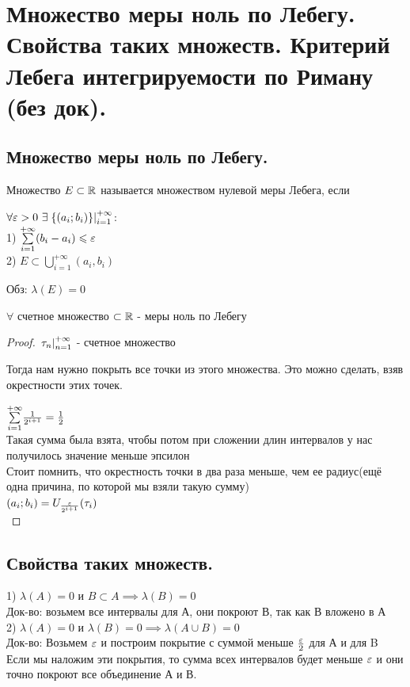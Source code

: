 \section{Множество меры ноль по Лебегу. Свойства таких множеств. Критерий Лебега интегрируемости по Риману (без док).}

\subsection{Множество меры ноль по Лебегу.}
\begin{definition}
    Множество $E \subset \R$ называется множеством нулевой меры Лебега, если

    $\forall \eps > 0~\exists\Subst{\{(a_i; b_i)\}}{i = 1}{+\infty}$:\\
    1) $\Sum{i = 1}{+\infty}(b_i - a_i) \leq \eps$\\
    2) $E \subset \bigcup_{i=1}^{+\infty} (a_i, b_i)$

    Обз: $\lambda(E) = 0$\\
\end{definition}

\begin{example}
    $\forall$ счетное множество $\subset \R$ - меры ноль по Лебегу
    \begin{proof}
        $\Subst{\tau_n}{n = 1}{+\infty}$ - счетное множество

        Тогда нам нужно покрыть все точки из этого множества. Это можно сделать, взяв окрестности этих точек.

        $\Sum{i = 1}{+\infty}\frac{1}{2^{i+1}} = \frac{1}{2}$\\
        Такая сумма была взята, чтобы потом при сложении длин интервалов у нас получилось значение меньше эпсилон\\
        Стоит помнить, что окрестность точки в два раза меньше, чем ее радиус(ещё одна причина, по которой мы взяли такую сумму)\\ 
        $(a_i; b_i) = U_{\frac{\eps}{2^{i+1}}}(\tau_i)$\\
    \end{proof}
\end{example}

\subsection{Свойства таких множеств.}
\begin{definition}[Свойства]
    1) $\lambda(A) = 0$ и $B \subset A \implies \lambda(B) = 0$\\
    Док-во: возьмем все интервалы для А, они покроют В, так как В вложено в А\\
    2) $\lambda(A) = 0$ и $\lambda(B) = 0 \implies \lambda(A \cup B) = 0$\\
    Док-во: Возьмем $\eps$ и построим покрытие с суммой меньше $\frac{\eps}{2}$ для А и для B\\
    Если мы наложим эти покрытия, то сумма всех интервалов будет меньше $\eps$ и они точно покроют все объединение А и В. 
\end{definition}

